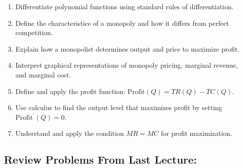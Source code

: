 \documentclass[
]{book}
\providecommand{\tightlist}{%
  \setlength{\itemsep}{0pt}\setlength{\parskip}{0pt}}
\begin{document}
\begin{enumerate}
\def\labelenumi{\arabic{enumi}.}
\tightlist
\item
  Differentiate polynomial functions using standard rules of differentiation.
\item
  Define the characteristics of a monopoly and how it differs from perfect competition.
\item
  Explain how a monopolist determines output and price to maximize profit.
\item
  Interpret graphical representations of monopoly pricing, marginal revenue, and marginal cost.
\item
  Define and apply the profit function: \(\text{Profit}(Q) = TR(Q) - TC(Q)\).
\item
  Use calculus to find the output level that maximizes profit by setting \(\text{Profit}^{\prime}(Q) = 0\).
\item
  Understand and apply the condition \(MR = MC\) for profit maximization.
\end{enumerate}

\subsection*{Review Problems From Last Lecture:}\label{review-problems-from-last-lecture-4}
\end{document}
